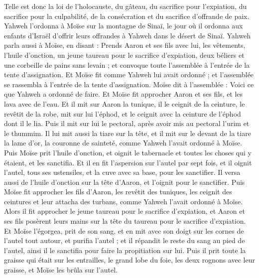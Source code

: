 \begin{multicols}{2}
Telle est donc la loi de l'holocauste, du gâteau, du sacrifice pour l'expiation, du sacrifice pour la culpabilité, de la consécration et du sacrifice d'offrande de paix.
Yahweh l'ordonna à Moïse sur la montagne de Sinaï, le jour où il ordonna aux enfants d'Israël d'offrir leurs offrandes à Yahweh dans le désert de Sinaï.
\VerseOne{}Yahweh parla aussi à Moïse, en disant :
Prends Aaron et ses fils avec lui, les vêtements, l'huile d'onction, un jeune taureau pour le sacrifice d'expiation, deux béliers et une corbeille de pains sans levain ;
et convoque toute l'assemblée à l'entrée de la tente d'assignation.
Et Moïse fit comme Yahweh lui avait ordonné ; et l'assemblée se rassembla à l'entrée de la tente d'assignation.
Moïse dit à l'assemblée : Voici ce que Yahweh a ordonné de faire.
Et Moïse fit approcher Aaron et ses fils, et les lava avec de l'eau.
Et il mit sur Aaron la tunique, il le ceignit de la ceinture, le revêtit de la robe, mit sur lui l'éphod, et le ceignit avec la ceinture de l'éphod dont il le lia.
Puis il mit sur lui le pectoral, après avoir mis au pectoral l'urim et le thummim.
Il lui mit aussi la tiare sur la tête, et il mit sur le devant de la tiare la lame d'or, la couronne de sainteté, comme Yahweh l'avait ordonné à Moïse.
Puis Moïse prit l'huile d'onction, et oignit le tabernacle et toutes les choses qui y étaient, et les sanctifia.
Et il en fit l'aspersion sur l'autel par sept fois, et il oignit l'autel, tous ses ustensiles, et la cuve avec sa base, pour les sanctifier.
Il versa aussi de l'huile d'onction sur la tête d'Aaron, et l'oignit pour le sanctifier.
Puis Moïse fit approcher les fils d'Aaron, les revêtit des tuniques, les ceignit des ceintures et leur attacha des turbans, comme Yahweh l'avait ordonné à Moïse.
Alors il fit approcher le jeune taureau pour le sacrifice d'expiation, et Aaron et ses fils posèrent leurs mains sur la tête du taureau pour le sacrifice d'expiation.
Et Moïse l'égorgea, prit de son sang, et en mit avec son doigt sur les cornes de l'autel tout autour, et purifia l'autel ; et il répandit le reste du sang au pied de l'autel, ainsi il le sanctifia pour faire la propitiation sur lui.
Puis il prit toute la graisse qui était sur les entrailles, le grand lobe du foie, les deux rognons avec leur graisse, et Moïse les brûla sur l'autel.

\end{multicols}
